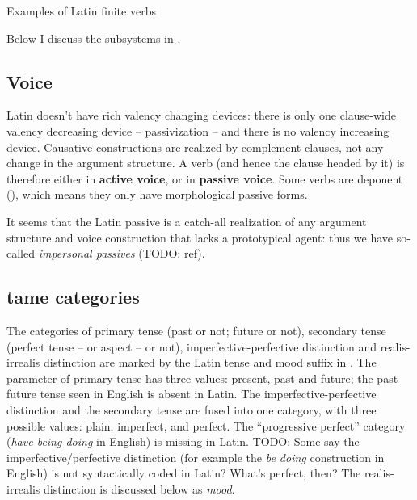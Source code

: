 \documentclass[a4paper, oneside, 12pt]{report}
\newcommand*{\concept}[1]{\textbf{#1}}
\newcommand{\form}[1]{\emph{#1}}
\begin{document}
\begin{sidewaystable}
    \centering
    \caption{Examples of Latin finite verbs}
    \label{tbl:latin-finite-verbs}
        
\end{sidewaystable}

Below I discuss the subsystems in .

\subsection{Voice}

Latin doesn't have rich valency changing devices:
there is only one clause-wide valency decreasing device -- passivization -- 
and there is no valency increasing device.
Causative constructions are realized by complement clauses,
not any change in the argument structure.
A verb (and hence the clause headed by it) is therefore either in \concept{active voice},
or in \concept{passive voice}.
Some verbs are deponent (),
which means they only have morphological passive forms.

It seems that the Latin passive is a catch-all realization of 
any argument structure and voice construction 
that lacks a prototypical agent: 
thus we have so-called \emph{impersonal passives} (TODO: ref).

\subsection{\acs{tame} categories}\label{sec:verb-inflection.finite-template.tame}

The categories of primary tense (past or not; future or not),
secondary tense (perfect tense -- or aspect -- or not),
imperfective-perfective distinction 
and realis-irrealis distinction 
are marked by the Latin tense and mood suffix in .
The parameter of primary tense has three values: 
present, past and future;
the past future tense seen in English 
is absent in Latin.
The imperfective-perfective distinction and the secondary tense 
are fused into one category,
with three possible values: 
plain, imperfect, and perfect. 
The ``progressive perfect'' category (\form{have being doing} in English)
is missing in Latin.
TODO: Some say the imperfective/perfective distinction 
(for example the \form{be doing} construction in English)
is not syntactically coded in Latin?
What's perfect, then?
The realis-irrealis distinction is discussed below as \emph{mood}.
\end{document}
